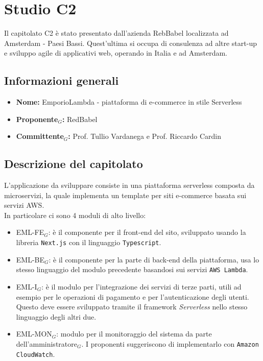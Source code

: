 \section{Studio C2}
Il capitolato C2 è stato presentato dall'azienda RebBabel localizzata ad Amsterdam - Paesi Bassi. Quest'ultima si occupa di consulenza ad altre start-up e sviluppo agile di applicativi web, operando in Italia e ad Amsterdam.

\subsection{Informazioni generali}
\begin{itemize}
	\item \textbf{Nome:} EmporioLambda - piattaforma di e-commerce in stile Serverless
	\item \textbf{Proponente$_G$:} RedBabel
	\item \textbf{Committente$_G$:} Prof. Tullio Vardanega e Prof. Riccardo Cardin
\end{itemize}

\subsection{Descrizione del capitolato}
L'applicazione da sviluppare consiste in una piattaforma serverless composta da microservizi, la quale implementa un template per siti e-commerce basata sui servizi AWS.\\
In particolare ci sono 4 moduli di alto livello:
\begin{itemize}
	\item EML-FE$_G$: è il componente per il front-end del sito, sviluppato usando la libreria \verb|Next.js| con il linguaggio \verb|Typescript|.
	\item EML-BE$_G$: è il componente per la parte di back-end della piattaforma, usa lo stesso linguaggio del modulo precedente basandosi sui servizi \verb|AWS Lambda|.
	\item EML-I$_G$: è il modulo per l'integrazione dei servizi di terze parti, utili ad esempio per le operazioni di pagamento e per l'autenticazione degli utenti. Questo deve essere sviluppato tramite il framework \textit{Serverless} nello stesso linguaggio degli altri due.
	\item EML-MON$_G$: modulo per il monitoraggio del sistema da parte dell'amministratore$_G$. I proponenti suggeriscono di implementarlo con \verb|Amazon CloudWatch|.
\end{itemize}

